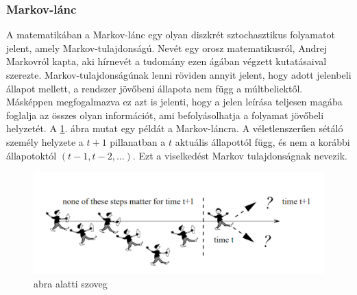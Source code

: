 

\subsubsection{Markov-lánc}

A matematikában a Markov-lánc egy olyan diszkrét sztochasztikus folyamatot jelent, amely Markov-tulajdonságú. Nevét egy orosz matematikusról, Andrej Markovról kapta, aki hírnevét a tudomány ezen ágában végzett kutatásaival szerezte. Markov-tulajdonságúnak lenni röviden annyit jelent, hogy adott jelenbeli állapot mellett, a rendszer jövőbeni állapota nem függ a múltbeliektől. Másképpen megfogalmazva ez azt is jelenti, hogy a jelen leírása teljesen magába foglalja az összes olyan információt, ami befolyásolhatja a folyamat jövőbeli helyzetét. A \ref{fig:markov}. ábra mutat egy példát a Markov-láncra. A véletlenszerűen sétáló személy helyzete a $t+1$ pillanatban a $t$ aktuális állapottól függ, és nem a korábbi állapotoktól $(t-1, t-2,\dots)$. Ezt a viselkedést Markov tulajdonságnak nevezik.


\begin{figure}[ht]
	\centering
	\includegraphics[width=1\columnwidth]{figures/markov_chain.png}
	\caption{abra alatti szoveg}
	\label{fig:markov}
\end{figure}


